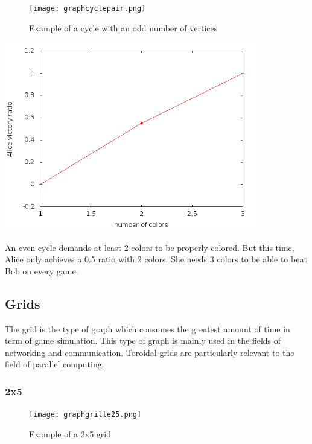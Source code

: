 \begin{figure}[h]
\begin{center}  
	\texttt{[image: graphcyclepair.png]}
\end{center}
    \caption{Example of a cycle with an odd number of vertices}
    \label{cyclepaire}
\end{figure}

\includegraphics[width=11cm]{resultats/cyclepair.png}

An even cycle demands at least 2 colors to be properly colored. But this time, Alice only achieves a 0.5 ratio with 2 colors. She needs 3 colors to be able to beat Bob on every game.

\subsection{Grids}

The grid is the type of graph which consumes the greatest amount of time in term of game simulation. This type of graph is mainly used in the fields of networking and communication. Toroidal grids are particularly relevant to the field of parallel computing.

\subsubsection{2x5}

\begin{figure}[h]
\begin{center}  
	\texttt{[image: graphgrille25.png]}
\end{center}
    \caption{Example of a 2x5 grid}
    \label{grid25}
\end{figure}

